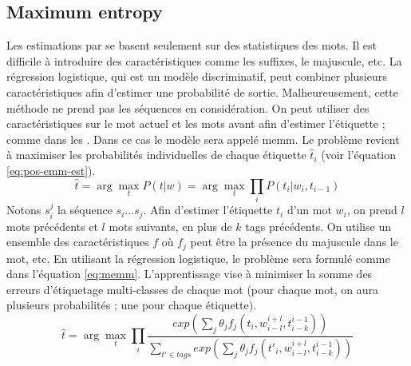 \documentclass{KodeBook}
\begin{document}
\subsection{Maximum entropy}

Les estimations par  se basent seulement sur des statistiques des mots. 
Il est difficile à introduire des caractéristiques comme les suffixes, le majuscule, etc. 
La régression logistique, qui est un modèle discriminatif, peut combiner plusieurs caractéristiques afin d'estimer une probabilité de sortie. 
Malheureusement, cette méthode ne prend pas les séquences en considération.
On peut utiliser des caractéristiques sur le mot actuel et les mots avant afin d'estimer l'étiquette ; comme dans les .
Dans ce cas le modèle sera appelé \acf{memm}.
Le problème revient à maximiser les probabilités individuelles de chaque étiquette $\hat{t}_i$ (voir l'équation \ref{eq:pos-emm-est}). 
\begin{equation}\label{eq:pos-emm-est}
\hat{t} = \arg\max\limits_t P(t | w) = \arg\max\limits_t \prod\limits_{i}  P(t_i | w_i, t_{i-1})
\end{equation}
Notons $s_i^j$ la séquence $s_i \ldots s_j$. 
Afin d'estimer l'étiquette $t_i$ d'un mot $w_i$, on prend $l$ mots précédents et $l$ mots suivants, en plus de $k$ tags précédents.
On utilise un ensemble des caractéristiques $f$ où $f_j$ peut être la présence du majuscule dans le mot, etc.
En utilisant la régression logistique, le problème sera formulé comme dans l'équation \ref{eq:memm}.
L'apprentissage vise à minimiser la somme des erreurs d'étiquetage multi-classes de chaque mot (pour chaque mot, on aura plusieurs probabilités ; une pour chaque étiquette).
\begin{equation}\label{eq:memm}
\hat{t} = \arg\max\limits_t \prod\limits_{i}  
\frac{exp\left(\sum_j \theta_j f_j(t_i, w_{i-l}^{i+l}, t_{i-k}^{i-1})\right)}%
{\sum_{t' \in tags} exp\left(\sum_j \theta_j f_j(t'_i, w_{i-l}^{i+l}, t_{i-k}^{i-1})\right)}
\end{equation}
\end{document}
